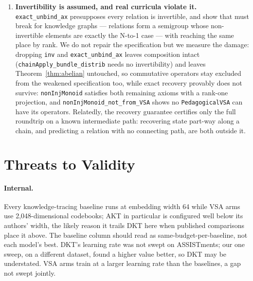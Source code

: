 \documentclass[10pt]{article}
\begin{document}
\begin{enumerate}
\item \textbf{Invertibility is assumed, and real curricula violate it.} \texttt{exact\_unbind\_ax} presupposes every relation is invertible, and \citet{yang2022knowledgebra} show that must break for knowledge graphs --- relations form a semigroup whose non-invertible elements are exactly the N-to-1 case --- with \citet{chaki2026kraus} reaching the same place by rank. We do not repair the specification but we measure the damage: dropping \texttt{inv} and \texttt{exact\_unbind\_ax} leaves composition intact (\texttt{chainApply\_bundle\_distrib} needs no invertibility) and leaves Theorem~\ref{thm:abelian} untouched, so commutative operators stay excluded from the weakened specification too, while exact recovery provably does not survive: \texttt{nonInjMonoid} satisfies both remaining axioms with a rank-one projection, and \texttt{nonInjMonoid\_not\_from\_VSA} shows no \texttt{PedagogicalVSA} can have its operators. Relatedly, the recovery guarantee certifies only the full roundtrip on a known intermediate path: recovering state part-way along a chain, and predicting a relation with no connecting path, are both outside it.
\end{enumerate}


\section{Threats to Validity}
\label{sec:threats}

\paragraph{Internal.} Every knowledge-tracing baseline runs at embedding width 64 while VSA arms use 2{,}048-dimensional codebooks; AKT in particular is configured well below its authors' width, the likely reason it trails DKT here when published comparisons place it above. The baseline column should read as same-budget-per-baseline, not each model's best. DKT's learning rate was not swept on ASSISTments; our one sweep, on a different dataset, found a higher value better, so DKT may be understated. VSA arms train at a larger learning rate than the baselines, a gap not swept jointly.
\end{document}
